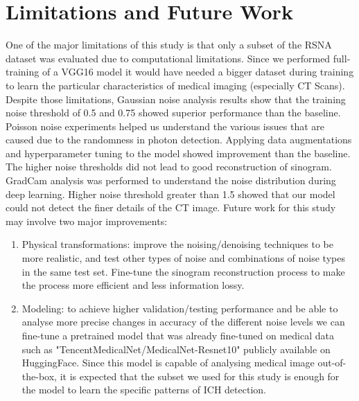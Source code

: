 \documentclass{article}
\begin{document}
\section{Limitations and Future Work} 
\begin{par}
    One of the major limitations of this study is that only a subset of the RSNA dataset was evaluated due to computational limitations. Since we performed full-training of a VGG16 model it would have needed a bigger dataset during training to learn the particular characteristics of medical imaging (especially CT Scans).
    Despite those limitations, Gaussian noise analysis results show that the training noise threshold of 0.5 and 0.75 showed superior performance than the baseline. Poisson noise experiments helped us understand the various issues that are caused due to the randomness in photon detection. Applying data augmentations and hyperparameter tuning to the model showed improvement than the baseline. The higher noise thresholds did not lead to good reconstruction of sinogram. GradCam analysis was performed to understand the noise distribution during deep learning. Higher noise threshold greater than 1.5 showed that our model could not detect the finer details of the CT image. 
    Future work for this study may involve two major improvements:
    \begin{enumerate}
        \item Physical transformations: improve the noising/denoising techniques to be more realistic, and test other types of noise and combinations of noise types in the same test set. Fine-tune the sinogram reconstruction process to make the process more efficient and less information lossy.
        \item Modeling: to achieve higher validation/testing performance and be able to analyse more precise changes in accuracy of the different noise levels we can fine-tune a pretrained model that was already fine-tuned on medical data such as "TencentMedicalNet/MedicalNet-Resnet10" publicly available on HuggingFace. Since this model is capable of analysing medical image out-of-the-box, it is expected that the subset we used for this study is enough for the model to learn the specific patterns of ICH detection.
    \end{enumerate}
\end{par}

\end{document}
